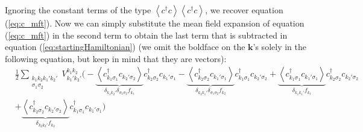 Ignoring the constant terms of the type $\left\langle c^\dagger c \right\rangle \left\langle c^\dagger c \right\rangle$, we recover equation (\ref{eq:c_mft}).
Now we can simply substitute the mean field expansion of equation (\ref{eq:c_mft}) in the second term to  obtain the last term that is subtracted in equation (\ref{eq:startingHamiltonian}) (we omit the boldface on the $\bm k$'s solely in the following equation, but keep in mind that they are vectors):
\begin{equation}\label{eq:mean_field}
\begin{split}
&\frac{1}{2} \sum_{\substack{ k_1 k_2 k_1' k_2' \\ \sigma_1 \sigma_2} } V^{k_1 k_2}_{k_1' k_2'} \bigg( - \underbrace{\left\langle c_{k_1 \sigma_1}^\dagger c_{k_2' \sigma_2} \right\rangle}_{\delta_{k_1 k_2'} \delta_{\sigma_1 \sigma_2} f_{k_1} } c_{k_2 \sigma_2}^\dagger c_{k_1' \sigma_1}  - \underbrace{\left\langle c_{k_2 \sigma_2}^\dagger c_{k_1' \sigma_1}  \right\rangle}_{\delta_{k_2 k_1'} \delta_{\sigma_1 \sigma_2} f_{k_2} } c_{k_1 \sigma_1}^\dagger c_{k_2' \sigma_2} + \underbrace{\left\langle c_{k_1 \sigma_1}^\dagger c_{k_1' \sigma_1} \right\rangle}_{\delta_{k_1 k_1'} f_{k_1} } c_{k_2 \sigma_2}^\dagger c_{k_2' \sigma_2}  \\
& + \underbrace{\left\langle c_{k_2 \sigma_2}^\dagger c_{k_2' \sigma_2} \right\rangle}_{\delta_{k_2 k_2'} f_{k_2} } c_{k_1 \sigma_1}^\dagger c_{k_1' \sigma_1} \bigg)\\
\end{split}
\end{equation}

